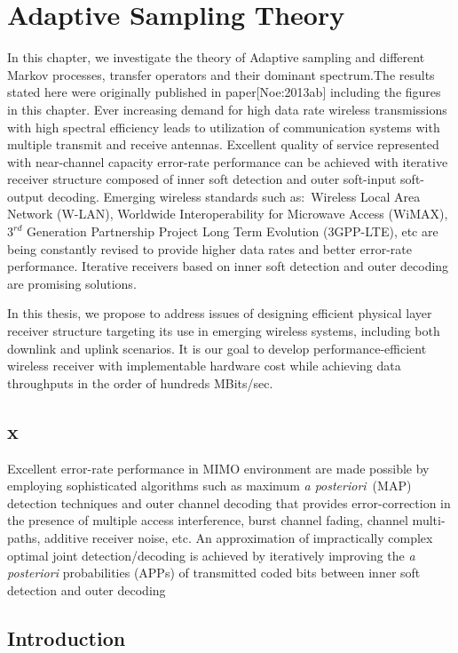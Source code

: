 \chapter{Adaptive Sampling Theory}
\label{ch:chapter3}
In this chapter, we investigate the theory of Adaptive sampling and different Markov processes, transfer operators and their dominant spectrum.The results stated here were originally published in paper[Noe:2013ab] including the figures in this chapter.
Ever increasing demand for high data rate wireless transmissions with high spectral efficiency leads to utilization of communication systems with multiple transmit and receive antennas. Excellent quality of service represented with near-channel capacity error-rate performance can be achieved with iterative receiver structure composed of inner soft detection and outer soft-input soft-output decoding. Emerging wireless standards such as:~Wireless Local Area Network (W-LAN), Worldwide Interoperability for Microwave Access (WiMAX), $3^{rd}$ Generation Partnership Project Long Term Evolution (3GPP-LTE), etc are being constantly revised to provide higher data rates and better error-rate performance. Iterative receivers based on inner soft detection and outer decoding are promising solutions.

In this thesis, we propose to address issues of designing efficient physical layer receiver structure targeting its use in emerging wireless systems, including both downlink and uplink scenarios. It is our goal to develop performance-efficient wireless receiver with implementable hardware cost while achieving data throughputs in the order of hundreds MBits/sec. 

\section{x}
\label{sec:x3}
Excellent error-rate performance in MIMO environment are made possible by employing sophisticated algorithms such as maximum \emph{a posteriori}~(MAP) detection techniques and outer channel decoding that provides error-correction in the presence of multiple access interference, burst channel fading, channel multi-paths, additive receiver noise, etc. An approximation of impractically complex optimal joint detection/decoding is achieved by iteratively improving the \emph{a posteriori} probabilities (APPs) of transmitted coded bits between inner soft detection and outer decoding


\section{\label{sec:intro2}Introduction}

